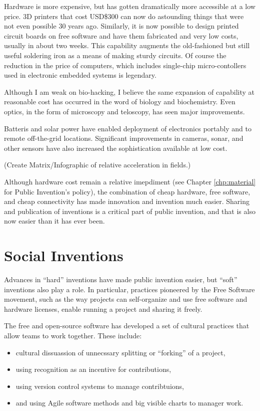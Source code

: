 \documentclass[
	fontsize=10pt, %
	twoside=false, %
	secnumdepth=1, %
]{kaobook}
\begin{document}
Hardware is more expensive, but has gotten dramatically
more accessible at a low price. 3D printers that cost USD\$300
can now do astounding things that were not even possible 30
years ago. Similarly, it is now possible to design printed
circuit boards on free software and have them fabricated
and very low costs, usually in about two weeks.
This capability augments the old-fashioned but still
useful soldering iron as a means of making sturdy circuits.
Of course the reduction in the price of computers, which
includes single-chip micro-contollers used in electronic
embedded systems is legendary.

Although I am weak on bio-hacking, I believe the same
expansion of capability at reasonable cost has occurred in
the word of biology and biochemistry.
Even optics, in the form of microscopy and teloscopy,
has seen major improvements.

Batteris and solar power have enabled deployment of
electronics portably and to remote off-the-grid locations.
Significant improvements in cameras, sonar, and other
sensors have also increased the sophistication available
at low cost.

(Create Matrix/Infographic of relative acceleration in fields.)

Although hardware cost remain a relative imepdiment
(see Chapter \ref{chp:material} for Public Invention's policy),
the combination of cheap hardware, free software, and
cheap connectivity has made innovation and invention much easier.
Sharing and publication of inventions is a
critical part of public invention, and that is also
now easier than it has ever been.

\chapter{Social Inventions}

Advances in ``hard'' inventions
have made public invention easier,
but ``soft'' inventions also play a role.
In particular, practices pioneered by the Free Software movement,
such as the way projects can self-organize and use
free software and hardware licenses, enable running a
project and sharing it freely.

The free and open-source software has developed a
set of cultural practices that allow teams to work together.
These include:
\begin{itemize}
\item cultural dissuassion of unnecssary splitting or ``forking'' of a project,
\item using recognition as an incentive for contributions,
\item using version control systems to manage contribtuions,
\item and using Agile software methods and big visible charts
  to manager work.
\end{itemize}
\end{document}
